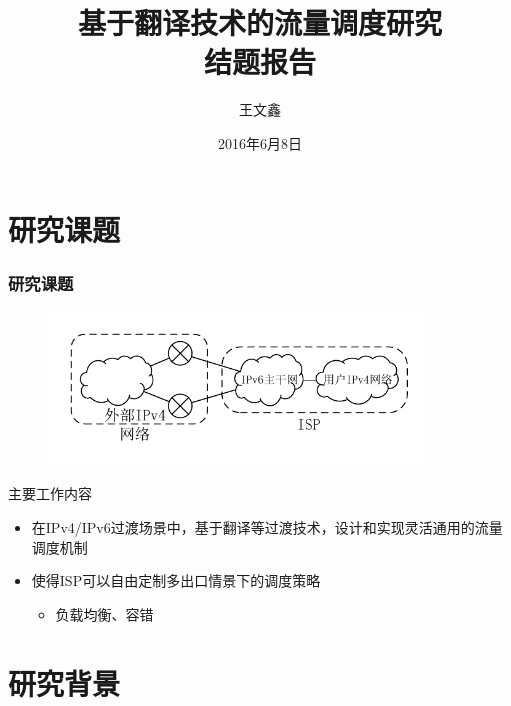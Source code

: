\documentclass{beamer}
\title{
  基于翻译技术的流量调度研究 \\
  结题报告
}
\author{王文鑫}
\date{2016年6月8日}
\begin{document}
\begin{frame}
  \titlepage
\end{frame}

\section{研究课题}

\begin{frame}
  \frametitle{研究课题}

  \vspace{-1em}
  \begin{figure}
    \includegraphics[width=0.9\textwidth]{figs/0-purpose.pdf}
  \end{figure}
  \vspace{-2em}

  \begin{block}{主要工作内容}
    \begin{itemize}
    \item 在IPv4/IPv6过渡场景中，基于翻译等过渡技术，设计和实现灵活通用的流量调度机制
    \item 使得ISP可以自由定制多出口情景下的调度策略
      \begin{itemize}
      \item 负载均衡、容错
      \end{itemize}
    \end{itemize}
  \end{block}
\end{frame}

\section{研究背景}
\end{document}
